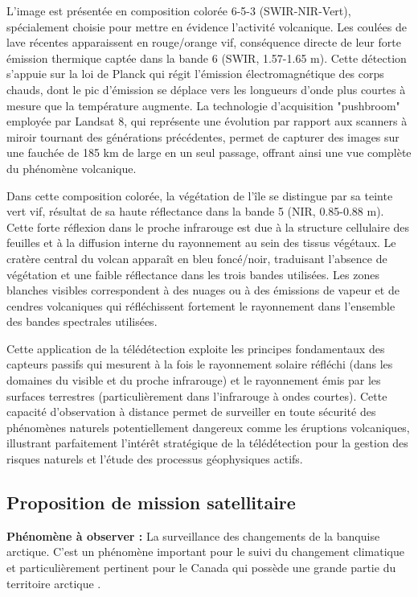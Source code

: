 \documentclass[12pt,a4paper]{article}
\begin{document}
L'image est présentée en composition colorée 6-5-3 (SWIR-NIR-Vert), spécialement choisie pour mettre en évidence l'activité volcanique. Les coulées de lave récentes apparaissent en rouge/orange vif, conséquence directe de leur forte émission thermique captée dans la bande 6 (SWIR, 1.57-1.65 \textmu m). Cette détection s'appuie sur la loi de Planck qui régit l'émission électromagnétique des corps chauds, dont le pic d'émission se déplace vers les longueurs d'onde plus courtes à mesure que la température augmente. La technologie d'acquisition "pushbroom" employée par Landsat 8, qui représente une évolution par rapport aux scanners à miroir tournant des générations précédentes, permet de capturer des images sur une fauchée de 185 km de large en un seul passage, offrant ainsi une vue complète du phénomène volcanique.

Dans cette composition colorée, la végétation de l'île se distingue par sa teinte vert vif, résultat de sa haute réflectance dans la bande 5 (NIR, 0.85-0.88 \textmu m). Cette forte réflexion dans le proche infrarouge est due à la structure cellulaire des feuilles et à la diffusion interne du rayonnement au sein des tissus végétaux. Le cratère central du volcan apparaît en bleu foncé/noir, traduisant l'absence de végétation et une faible réflectance dans les trois bandes utilisées. Les zones blanches visibles correspondent à des nuages ou à des émissions de vapeur et de cendres volcaniques qui réfléchissent fortement le rayonnement dans l'ensemble des bandes spectrales utilisées.

Cette application de la télédétection exploite les principes fondamentaux des capteurs passifs qui mesurent à la fois le rayonnement solaire réfléchi (dans les domaines du visible et du proche infrarouge) et le rayonnement émis par les surfaces terrestres (particulièrement dans l'infrarouge à ondes courtes). Cette capacité d'observation à distance permet de surveiller en toute sécurité des phénomènes naturels potentiellement dangereux comme les éruptions volcaniques, illustrant parfaitement l'intérêt stratégique de la télédétection pour la gestion des risques naturels et l'étude des processus géophysiques actifs.

\subsection{Proposition de mission satellitaire}

\textbf{Phénomène à observer :} La surveillance des changements de la banquise arctique. C'est un phénomène important pour le suivi du changement climatique et particulièrement pertinent pour le Canada qui possède une grande partie du territoire arctique \citep{Derksen2019}.
\end{document}
